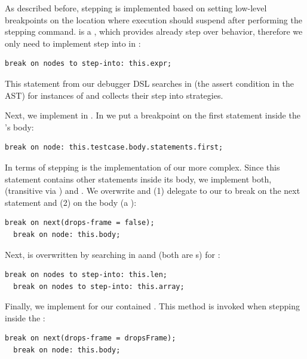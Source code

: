  As described before, stepping is implemented based on setting
low-level breakpoints on the location where execution should suspend after
performing the stepping command.  is a , which
provides already step over behavior, therefore we only need to implement step
into in :

\begin{lstlisting}[language=mbeddr]
break on nodes to step-into: this.expr;
\end{lstlisting}

This statement from our debugger \ac{DSL} searches in  (the
assert condition in the \ac{AST}) for instances of  and
collects their step into strategies. 

Next, we implement  in . In 
 we put a breakpoint on the first statement
inside the 's body:

\begin{lstlisting}[language=mbeddr]
break on node: this.testcase.body.statements.first;
\end{lstlisting}

In terms of stepping is the implementation of our  more
complex. Since this statement contains other statements inside its body,
we implement both,  (transitive via ) and
. We overwrite  and
(1) delegate to our  to break on the next statement and
(2) on the body (a ):
\begin{lstlisting}[language=mbeddr]
  break on next(drops-frame = false); 
  break on node: this.body; 
\end{lstlisting}

Next,  is overwritten by searching in 
aand  (both are s) for :
\begin{lstlisting}[language=mbeddr]
  break on nodes to step-into: this.len; 
  break on nodes to step-into: this.array; 
\end{lstlisting}

Finally, we implement  for our
contained . This method is invoked when stepping inside the
:

\begin{lstlisting}[frame=single,language=mbeddr]
  break on next(drops-frame = dropsFrame); 
  break on node: this.body; 
\end{lstlisting}

